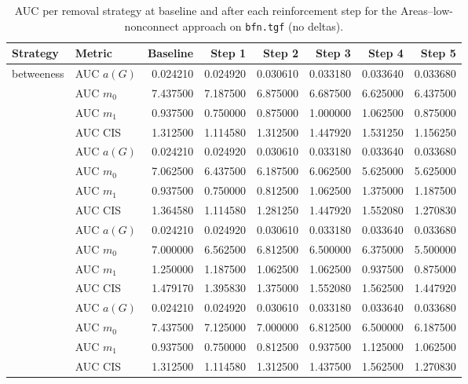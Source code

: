 \begin{table}[htbp]
  \centering
  \caption{AUC per removal strategy at baseline and after each reinforcement step for the Areas–low-nonconnect approach on \texttt{bfn.tgf} (no deltas).}
  \label{tab:bfn-areas_low_nonconnect-auc}
  \begin{tabular}{llrrrrrr}
    \toprule
    \textbf{Strategy} & \textbf{Metric} & \textbf{Baseline} & \textbf{Step 1} & \textbf{Step 2} & \textbf{Step 3} & \textbf{Step 4} & \textbf{Step 5} \\
    \midrule
    \multirow{4}{*}{betweeness} & AUC $a(G)$ & 0.024210 & 0.024920 & 0.030610 & 0.033180 & 0.033640 & 0.033680 \\
    & AUC $m_0$ & 7.437500 & 7.187500 & 6.875000 & 6.687500 & 6.625000 & 6.437500 \\
    & AUC $m_1$ & 0.937500 & 0.750000 & 0.875000 & 1.000000 & 1.062500 & 0.875000 \\
    & AUC CIS & 1.312500 & 1.114580 & 1.312500 & 1.447920 & 1.531250 & 1.156250 \\
    \addlinespace
    \multirow{4}{*}{closeness} & AUC $a(G)$ & 0.024210 & 0.024920 & 0.030610 & 0.033180 & 0.033640 & 0.033680 \\
    & AUC $m_0$ & 7.062500 & 6.437500 & 6.187500 & 6.062500 & 5.625000 & 5.625000 \\
    & AUC $m_1$ & 0.937500 & 0.750000 & 0.812500 & 1.062500 & 1.375000 & 1.187500 \\
    & AUC CIS & 1.364580 & 1.114580 & 1.281250 & 1.447920 & 1.552080 & 1.270830 \\
    \addlinespace
    \multirow{4}{*}{core influence} & AUC $a(G)$ & 0.024210 & 0.024920 & 0.030610 & 0.033180 & 0.033640 & 0.033680 \\
    & AUC $m_0$ & 7.000000 & 6.562500 & 6.812500 & 6.500000 & 6.375000 & 5.500000 \\
    & AUC $m_1$ & 1.250000 & 1.187500 & 1.062500 & 1.062500 & 0.937500 & 0.875000 \\
    & AUC CIS & 1.479170 & 1.395830 & 1.375000 & 1.552080 & 1.562500 & 1.447920 \\
    \addlinespace
    \multirow{4}{*}{degree} & AUC $a(G)$ & 0.024210 & 0.024920 & 0.030610 & 0.033180 & 0.033640 & 0.033680 \\
    & AUC $m_0$ & 7.437500 & 7.125000 & 7.000000 & 6.812500 & 6.500000 & 6.187500 \\
    & AUC $m_1$ & 0.937500 & 0.750000 & 0.812500 & 0.937500 & 1.125000 & 1.062500 \\
    & AUC CIS & 1.312500 & 1.114580 & 1.312500 & 1.437500 & 1.562500 & 1.270830 \\

\end{tabular}
\end{table}
